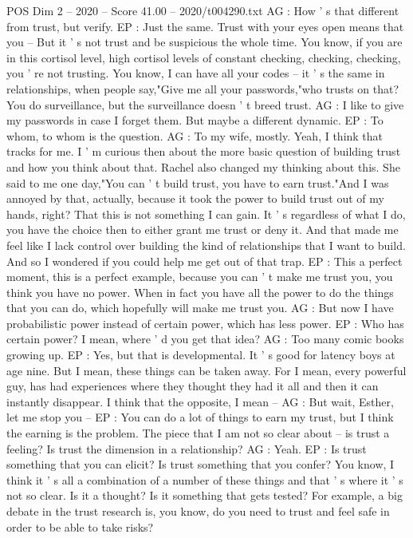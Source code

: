 \begin{textsample}{POS Dim 2 – 2020 – Score 41.00 – 2020/t004290.txt}
AG : How ' s that different from trust, but verify.
EP : Just the same.
Trust with your eyes open means that you -- But it ' s not trust and be suspicious the whole time.
You know, if you are in this cortisol level, high cortisol levels of constant checking, checking, checking, you ' re not trusting.
You know, I can have all your codes -- it ' s the same in relationships, when people say,"Give me all your passwords,"who trusts on that?
You do surveillance, but the surveillance doesn ' t breed trust.
AG : I like to give my passwords in case I forget them.
But maybe a different dynamic.
EP : To whom, to whom is the question.
AG : To my wife, mostly.
Yeah, I think that tracks for me.
I ' m curious then about the more basic question of building trust and how you think about that.
Rachel also changed my thinking about this.
She said to me one day,"You can ' t build trust, you have to earn trust."And I was annoyed by that, actually, because it took the power to build trust out of my hands, right?
That this is not something I can gain.
It ' s regardless of what I do, you have the choice then to either grant me trust or deny it.
And that made me feel like I lack control over building the kind of relationships that I want to build.
And so I wondered if you could help me get out of that trap.
EP : This a perfect moment, this is a perfect example, because you can ' t make me trust you, you think you have no power.
When in fact you have all the power to do the things that you can do, which hopefully will make me trust you.
AG : But now I have probabilistic power instead of certain power, which has less power.
EP : Who has certain power?
I mean, where ' d you get that idea?
AG : Too many comic books growing up.
EP : Yes, but that is developmental.
It ' s good for latency boys at age nine.
But I mean, these things can be taken away.
For I mean, every powerful guy, has had experiences where they thought they had it all and then it can instantly disappear.
I think that the opposite, I mean -- AG : But wait, Esther, let me stop you -- EP : You can do a lot of things to earn my trust, but I think the earning is the problem.
The piece that I am not so clear about -- is trust a feeling?
Is trust the dimension in a relationship?
AG : Yeah.
EP : Is trust something that you can elicit?
Is trust something that you confer?
You know, I think it ' s all a combination of a number of these things and that ' s where it ' s not so clear.
Is it a thought?
Is it something that gets tested?
For example, a big debate in the trust research is, you know, do you need to trust and feel safe in order to be able to take risks?

\end{textsample}
